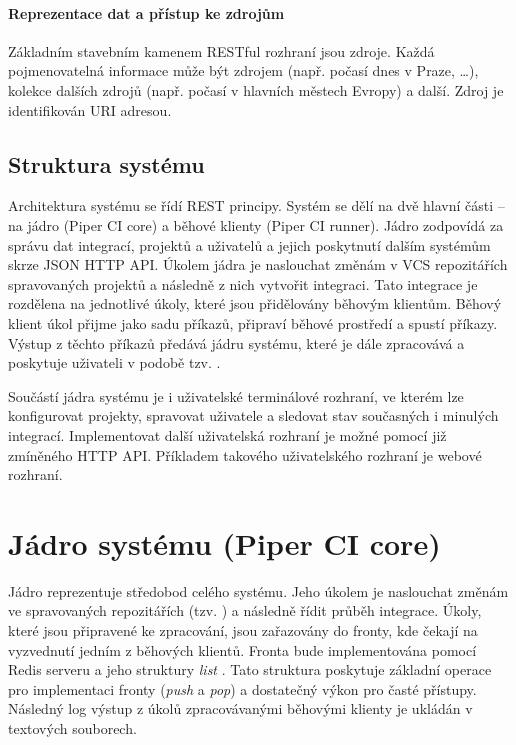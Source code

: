 \paragraph{Reprezentace dat a přístup ke zdrojům}

Základním stavebním kamenem RESTful rozhraní jsou zdroje.
Každá pojmenovatelná informace může být zdrojem (např. počasí dnes v Praze, \ldots), kolekce dalších zdrojů (např. počasí v hlavních městech Evropy) a další.
Zdroj je identifikován URI adresou.

\subsection{Struktura systému}

Architektura systému se řídí REST principy.
Systém se dělí na dvě hlavní části -- na jádro (Piper CI core) a běhové klienty (Piper CI runner).
Jádro zodpovídá za správu dat integrací, projektů a uživatelů a jejich poskytnutí dalším systémům skrze JSON HTTP API.
Úkolem jádra je naslouchat změnám v VCS repozitářích spravovaných projektů a následně z nich vytvořit integraci.
Tato integrace je rozdělena na jednotlivé úkoly, které jsou přidělovány běhovým klientům.
Běhový klient úkol přijme jako sadu příkazů, připraví běhové prostředí a spustí příkazy.
Výstup z těchto příkazů předává jádru systému, které je dále zpracovává a poskytuje uživateli v podobě tzv. .


Součástí jádra systému je i uživatelské terminálové rozhraní, ve kterém lze konfigurovat projekty, spravovat uživatele a sledovat stav současných i minulých integrací.
Implementovat další uživatelská rozhraní je možné pomocí již zmíněného HTTP API.
Příkladem takového uživatelského rozhraní je webové rozhraní.

\section{Jádro systému (Piper CI core)}

Jádro reprezentuje středobod celého systému.
Jeho úkolem je naslouchat změnám ve spravovaných repozitářích (tzv. ) a následně řídit průběh integrace.
Úkoly, které jsou připravené ke zpracování, jsou zařazovány do fronty, kde čekají na vyzvednutí jedním z běhových klientů.
Fronta bude implementována pomocí Redis serveru a jeho struktury \textit{list} \cite{redis}.
Tato struktura poskytuje základní operace pro implementaci fronty (\textit{push} a \textit{pop}) a dostatečný výkon pro časté přístupy.
Následný log výstup z úkolů zpracovávanými běhovými klienty je ukládán v textových souborech.

